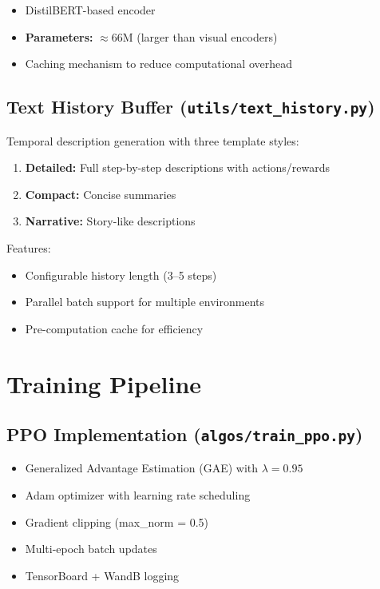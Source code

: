 \documentclass[12pt,a4paper,openany]{report}
\begin{document}
\begin{itemize}
    \item DistilBERT-based encoder
    \item \textbf{Parameters:} $\approx 66\text{M}$ (larger than visual encoders)
    \item Caching mechanism to reduce computational overhead
\end{itemize}

\subsection{Text History Buffer (\texttt{utils/text\_history.py})}

Temporal description generation with three template styles:

\begin{enumerate}
    \item \textbf{Detailed:} Full step-by-step descriptions with actions/rewards
    \item \textbf{Compact:} Concise summaries
    \item \textbf{Narrative:} Story-like descriptions
\end{enumerate}

Features:
\begin{itemize}
    \item Configurable history length (3--5 steps)
    \item Parallel batch support for multiple environments
    \item Pre-computation cache for efficiency
\end{itemize}

\section{Training Pipeline}

\subsection{PPO Implementation (\texttt{algos/train\_ppo.py})}

\begin{itemize}
    \item Generalized Advantage Estimation (GAE) with $\lambda = 0.95$
    \item Adam optimizer with learning rate scheduling
    \item Gradient clipping (max\_norm = 0.5)
    \item Multi-epoch batch updates
    \item TensorBoard + WandB logging
\end{itemize}
\end{document}
